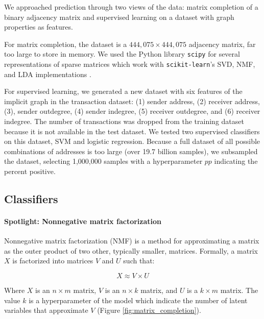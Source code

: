 \documentclass{article} %
\begin{document}
We approached prediction through two views of the data: matrix completion of a binary adjacency matrix and supervised learning on a dataset with graph properties as features.

For matrix completion, the dataset is a $444,075 \times 444,075$ adjacency matrix, far too large to store in memory. We used the Python library \texttt{scipy} for several representations of sparse matrices which work with \texttt{scikit-learn}'s SVD, NMF, and LDA implementations \cite{jones2014scipy} \cite{scikit-learn}.

For supervised learning, we generated a new dataset with six features of the implicit graph in the transaction dataset: (1) sender address, (2) receiver address, (3), sender outdegree, (4) sender indegree, (5) receiver outdegree, and (6) receiver indegree. The number of transactions was dropped from the training dataset because it is not available in the test dataset. We tested two supervised classifiers on this dataset, SVM and logistic regression. Because a full dataset of all possible combinations of addresses is too large (over 19.7 billion samples), we subsampled the dataset, selecting 1,000,000 samples with a hyperparameter $pp$ indicating the percent positive.

\subsection{Classifiers}\label{classifiers}

\paragraph{Spotlight: Nonnegative matrix factorization}\label{Spotlight}

Nonnegative matrix factorization (NMF) is a method for approximating a matrix as the outer product of two other, typically smaller, matrices. Formally, a matrix $X$ is factorized into matrices $V$ and $U$ such that:

\begin{equation} \label{eq:1}
X \approx V \times U
\end{equation}

Where $X$ is an $n \times m$ matrix, $V$ is an $n \times k$ matrix, and $U$ is a $k \times m$ matrix. The value $k$ is a hyperparameter of the model which indicate the number of latent variables that approximate $V$ (Figure \ref{fig:matrix_completion}).
\end{document}
